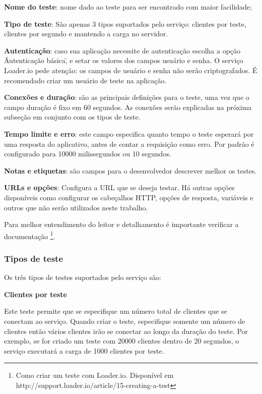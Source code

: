  \textbf{Nome do teste}: nome dado ao teste para ser encontrado com maior facilidade;

  \textbf{Tipo de teste}: São apenas 3 tipos suportados pelo serviço: clientes por teste, clientes por segundo e mantendo
  a carga no servidor.

  \textbf{Autenticação}: caso sua aplicação necessite de autenticação escolha a opção \"Autenticação básica\",
  e setar os valores dos campos usuário e senha. O serviço Loader.io pede atenção:
  os campos de usuário e senha não serão criptografados. É recomendado criar um usuário de teste na aplicação.

  \textbf{Conexões e duração}: são as principais definições para o teste, uma vez que o campo duração
  é fixo em 60 segundos. As conexões serão explicadas na próxima subseção em conjunto com os tipos de teste.

  \textbf{Tempo limite e erro}: este campo especifica quanto tempo o teste esperará por uma resposta do aplicativo, antes
  de contar a requisição como erro. Por padrão é configurado para 10000 milissegundos ou 10 segundos.

  \textbf{Notas e etiquetas}: são campos para o desenvolvedor descrever  melhor os testes.

  \textbf{URLs e opções}: Configura a \ac{URL} que se deseja testar. Há outras opções disponíveis como configurar os cabeçalhos \ac{HTTP},
  opções de resposta, variáveis e outros que não serão utilizados neste trabalho.

  Para melhor entendimento do leitor e detalhamento é importante verificar
  a documentação \footnote[19]{Como criar um teste com Loader.io. Disponível em http://support.loader.io/article/15-creating-a-test}.

\subsubsection{Tipos de teste}

  Os três tipos de testes suportados pelo serviço são:

  \textbf{Clientes por teste}

  Este teste permite que se especifique um número total de clientes que se conectam ao serviço. Quando criar o teste,
  especifique somente um número de clientes então vários clientes irão se conectar ao longo da duração do teste.
  Por exemplo, se for criado um teste com 20000 clientes dentro de 20 segundos, o serviço executará a carga de
  1000 clientes por teste.

